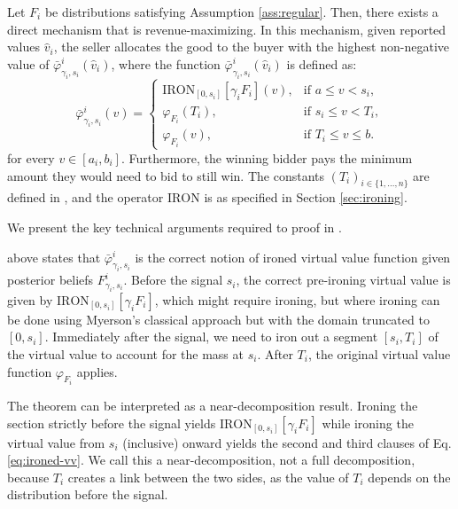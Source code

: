 \begin{theorem}\label{thm:main}
Let $F_i$ be distributions satisfying Assumption \ref{ass:regular}. Then, there exists a direct mechanism that is revenue-maximizing. In this mechanism, given reported values $\hat{v}_i$, the seller allocates the good to the buyer with the highest non-negative value of $\bar{\varphi}^i_{\gamma_i, s_i}(\hat{v}_i)$, where the function $\bar{\varphi}^i_{\gamma_i, s_i}(\hat{v}_i)$ is defined as:
\begin{equation}
\label{eq:ironed-vv} 
\bar{\varphi}^i_{\gamma_i, s_i}(v) = 
\begin{cases}
    \mathrm{IRON}_{[0, s_i]}[\gamma_i F_i](v), & \text{if } a \leq v < s_i, \\
    \varphi_{F_i}(T_i), & \text{if } s_i \leq v < T_i, \\
    \varphi_{F_i}(v), & \text{if } T_i \leq v \leq b.
\end{cases}
\end{equation}
for every $v \in [a_i, b_i]$. Furthermore, the winning bidder pays  the minimum amount they would need to bid to still win.
The constants $(T_i)_{i \in \{1, \ldots, n\}}$ are defined in , and the operator $\mathrm{IRON}$ is as specified in Section \ref{sec:ironing}.
\end{theorem}
We present the key technical arguments required to proof  in .


 above states that $\bar\varphi^i_{\gamma_i,s_i}$ is the correct notion of ironed virtual value function given posterior beliefs $F_{\gamma_i,s_i}^i$. Before the signal $s_i$, the correct pre-ironing virtual value is given by $\mathrm{IRON}_{[0, s_i]}[\gamma_i F_i]$, which might require ironing, but where ironing can be done using Myerson's classical approach but with the domain truncated to $[0,s_i]$. Immediately after the signal, we need to iron out a segment $[s_i,T_i]$ of the virtual value to account for the mass at $s_i$. After $T_i$, the original virtual value function $\varphi_{F_i}$ applies. 

The theorem can be interpreted as a near-decomposition result. Ironing the section strictly before the signal yields $\mathrm{IRON}_{[0, s_i]}[\gamma_i F_i]$ while ironing the virtual value from $s_i$ (inclusive) onward yields the second and third clauses of Eq. \eqref{eq:ironed-vv}.
We call this a near-decomposition, not a full decomposition, because $T_i$ creates a link between the two sides, as the value of $T_i$ depends on the distribution before the signal.

